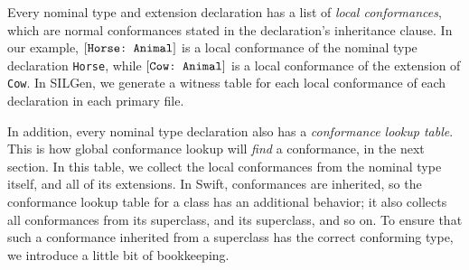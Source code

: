 \documentclass[../generics]{subfiles}
\begin{document}
Every nominal type and extension declaration has a list of \emph{local conformances}, which are normal conformances stated in the declaration's inheritance clause. In our example, $[\texttt{Horse:~Animal}]$ is a local conformance of the nominal type declaration \texttt{Horse}, while $[\texttt{Cow:~Animal}]$ is a local conformance of the extension of \texttt{Cow}. In SILGen, we generate a witness table for each local conformance of each declaration in each primary file.

In addition, every nominal type declaration also has a \emph{conformance lookup table}. This is how global conformance lookup will \emph{find} a conformance, in the next section. In this table, we collect the local conformances from the nominal type itself, and all of its extensions. In Swift, conformances are inherited, so the conformance lookup table for a class has an additional behavior; it also collects all conformances from its superclass, and its superclass, and so on. To ensure that such a conformance inherited from a superclass has the correct conforming type, we introduce a little bit of bookkeeping.
\end{document}
